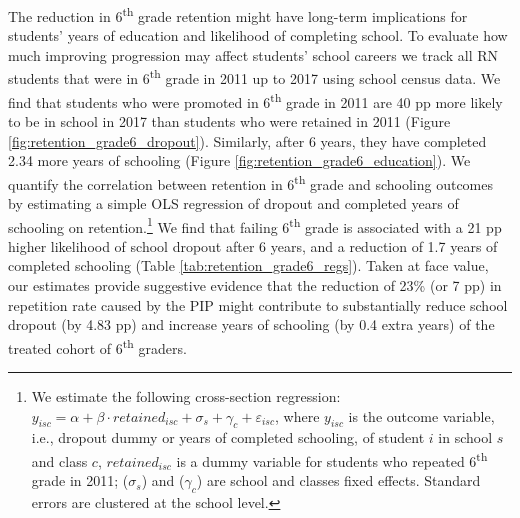\documentclass[11pt,a4paper]{article}
\begin{document}
\clearpage


The reduction in 6\textsuperscript{th} grade retention might have long-term implications for students’ years of education and likelihood of completing school. To evaluate how much improving progression may affect students' school careers we track all RN students that were in 6\textsuperscript{th} grade in 2011 up to 2017 using school census data. We find that students who were promoted in 6\textsuperscript{th} grade in 2011 are 40 pp more likely to be in school in 2017 than students who were retained in 2011 (Figure \ref{fig:retention_grade6_dropout}). Similarly, after 6 years, they have completed 2.34 more years of schooling (Figure \ref{fig:retention_grade6_education}). We quantify the correlation between retention in 6\textsuperscript{th} grade and schooling outcomes by estimating a simple OLS regression of dropout and completed years of schooling on retention.\footnote{We estimate the following cross-section regression: $y_{isc} = \alpha + \beta \cdot retained_{isc} + \sigma_{s} + \gamma_{c} + \varepsilon_{isc}$, where $y_{isc}$ is the outcome variable, i.e., dropout dummy or years of completed schooling, of student $i$ in school $s$ and class $c$, $retained_{isc}$ is a dummy variable for students who repeated 6\textsuperscript{th} grade in 2011; ($\sigma_{s}$) and ($\gamma_{c}$) are school and classes fixed effects. Standard errors are clustered at the school level.} We find that failing 6\textsuperscript{th} grade is associated with a 21 pp higher likelihood of school dropout after 6 years, and a reduction of 1.7 years of completed schooling (Table \ref{tab:retention_grade6_regs}). Taken at face value, our estimates provide suggestive evidence that the reduction of 23\% (or 7 pp) in repetition rate caused by the PIP might contribute to substantially reduce school dropout (by 4.83 pp) and increase years of schooling (by 0.4 extra years) of the treated cohort of 6\textsuperscript{th} graders.
\end{document}

